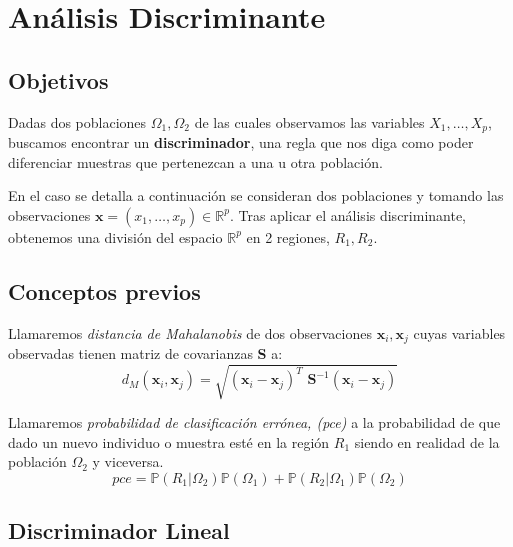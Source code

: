 \section{Análisis Discriminante}
\subsection{Objetivos}

\noindent Dadas dos poblaciones $\Omega_1,\Omega_2$ de las cuales observamos las variables $X_1, \ldots, X_p$, buscamos encontrar un \textbf{discriminador}, una regla que nos diga como poder diferenciar muestras que pertenezcan a una u otra población. 

\noindent En el caso se detalla a continuación se consideran dos poblaciones y tomando las observaciones $\textbf{x}=(x_1,\ldots,x_p)\in \mathbb{R}^p $. Tras aplicar el análisis discriminante, obtenemos una división del espacio $\mathbb{R}^p$ en 2 regiones, $R_1, R_2$. 

\subsection{Conceptos previos}
\begin{defi}
Llamaremos \textit{distancia de Mahalanobis} de dos observaciones $\textbf{x}_i,\textbf{x}_j$ cuyas variables observadas tienen matriz de covarianzas \textbf{S} a:
\begin{equation}
d_M(\textbf{x}_i,\textbf{x}_j)=\sqrt{(\textbf{x}_i-\textbf{x}_j)^T\textbf{ S}^{-1}(\textbf{x}_i-\textbf{x}_j) }
\end{equation}
\end{defi}

\begin{defi}
Llamaremos \textit{probabilidad de clasificación errónea, (pce)} a la probabilidad de que dado un nuevo individuo o muestra esté en la región $R_1$ siendo en realidad de la población $\Omega_2$ y viceversa. 
\begin{equation}
pce=\mathbb{P}(R_1|\Omega_2) \mathbb{P}(\Omega_1)+\mathbb{P}(R_2|\Omega_1) \mathbb{P}(\Omega_2)
\end{equation}
\end{defi}

\subsection{Discriminador Lineal}

\noindent